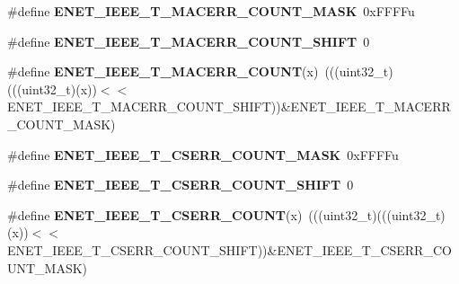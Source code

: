 \begin{DoxyCompactItemize}
\item 
\#define {\bfseries E\+N\+E\+T\+\_\+\+I\+E\+E\+E\+\_\+\+T\+\_\+\+M\+A\+C\+E\+R\+R\+\_\+\+C\+O\+U\+N\+T\+\_\+\+M\+A\+SK}~0x\+F\+F\+F\+Fu\hypertarget{group__ENET__Register__Masks_ga36adf7b60171de45b210bfdec494e6a4}{}\label{group__ENET__Register__Masks_ga36adf7b60171de45b210bfdec494e6a4}

\item 
\#define {\bfseries E\+N\+E\+T\+\_\+\+I\+E\+E\+E\+\_\+\+T\+\_\+\+M\+A\+C\+E\+R\+R\+\_\+\+C\+O\+U\+N\+T\+\_\+\+S\+H\+I\+FT}~0\hypertarget{group__ENET__Register__Masks_ga29ab60c8c05b2a4081ecdafe9cfa8b40}{}\label{group__ENET__Register__Masks_ga29ab60c8c05b2a4081ecdafe9cfa8b40}

\item 
\#define {\bfseries E\+N\+E\+T\+\_\+\+I\+E\+E\+E\+\_\+\+T\+\_\+\+M\+A\+C\+E\+R\+R\+\_\+\+C\+O\+U\+NT}(x)~(((uint32\+\_\+t)(((uint32\+\_\+t)(x))$<$$<$E\+N\+E\+T\+\_\+\+I\+E\+E\+E\+\_\+\+T\+\_\+\+M\+A\+C\+E\+R\+R\+\_\+\+C\+O\+U\+N\+T\+\_\+\+S\+H\+I\+FT))\&E\+N\+E\+T\+\_\+\+I\+E\+E\+E\+\_\+\+T\+\_\+\+M\+A\+C\+E\+R\+R\+\_\+\+C\+O\+U\+N\+T\+\_\+\+M\+A\+SK)\hypertarget{group__ENET__Register__Masks_ga712a08e94df6987bb200e27b72044213}{}\label{group__ENET__Register__Masks_ga712a08e94df6987bb200e27b72044213}

\item 
\#define {\bfseries E\+N\+E\+T\+\_\+\+I\+E\+E\+E\+\_\+\+T\+\_\+\+C\+S\+E\+R\+R\+\_\+\+C\+O\+U\+N\+T\+\_\+\+M\+A\+SK}~0x\+F\+F\+F\+Fu\hypertarget{group__ENET__Register__Masks_gaa0672cfe66f04b84789c73a1eeb66ade}{}\label{group__ENET__Register__Masks_gaa0672cfe66f04b84789c73a1eeb66ade}

\item 
\#define {\bfseries E\+N\+E\+T\+\_\+\+I\+E\+E\+E\+\_\+\+T\+\_\+\+C\+S\+E\+R\+R\+\_\+\+C\+O\+U\+N\+T\+\_\+\+S\+H\+I\+FT}~0\hypertarget{group__ENET__Register__Masks_gad924e12885d92c79e4ef3ec41026f929}{}\label{group__ENET__Register__Masks_gad924e12885d92c79e4ef3ec41026f929}

\item 
\#define {\bfseries E\+N\+E\+T\+\_\+\+I\+E\+E\+E\+\_\+\+T\+\_\+\+C\+S\+E\+R\+R\+\_\+\+C\+O\+U\+NT}(x)~(((uint32\+\_\+t)(((uint32\+\_\+t)(x))$<$$<$E\+N\+E\+T\+\_\+\+I\+E\+E\+E\+\_\+\+T\+\_\+\+C\+S\+E\+R\+R\+\_\+\+C\+O\+U\+N\+T\+\_\+\+S\+H\+I\+FT))\&E\+N\+E\+T\+\_\+\+I\+E\+E\+E\+\_\+\+T\+\_\+\+C\+S\+E\+R\+R\+\_\+\+C\+O\+U\+N\+T\+\_\+\+M\+A\+SK)\hypertarget{group__ENET__Register__Masks_gaecf8a547340b8a07699467f79f3989fc}{}\label{group__ENET__Register__Masks_gaecf8a547340b8a07699467f79f3989fc}


\end{DoxyCompactItemize}
